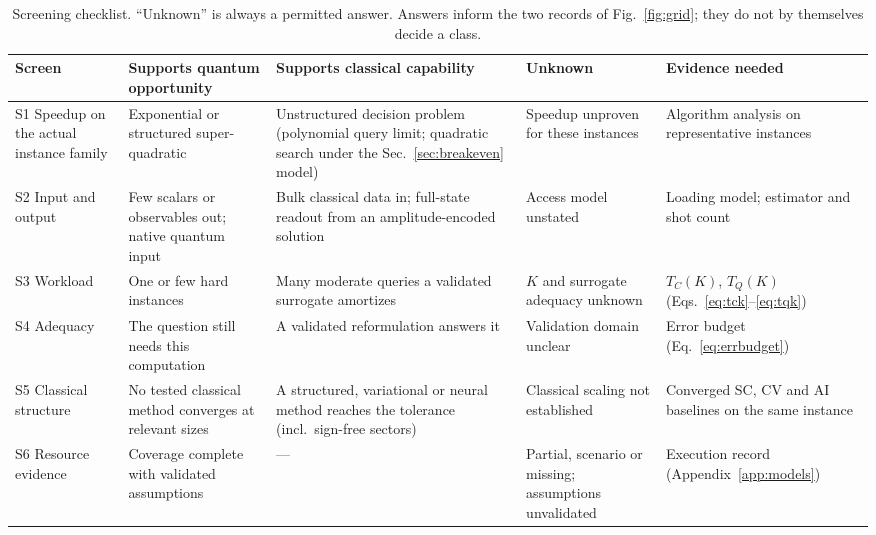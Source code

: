 \documentclass[10pt,a4paper]{article}
\newcommand{\mtC}{\textcolor{qcF}{\textsf{complete}}}
\begin{document}
\begin{table}[htbp]
\centering\scriptsize
\setlength{\tabcolsep}{4pt}
\caption{Screening checklist. ``Unknown'' is always a permitted answer. Answers inform the two records of Fig.~\ref{fig:grid}; they do not by themselves decide a class.}\label{tab:checklist}
\begin{tabular}{@{}L{3.1cm} >{}L{3.0cm} >{}L{3.0cm} >{}L{2.5cm} L{3.2cm}@{}}
\toprule
Screen & Supports quantum opportunity & Supports classical capability & Unknown & Evidence needed\\\midrule
S1 Speedup on the actual instance family & Exponential or structured super-quadratic & Unstructured decision problem (polynomial query limit; quadratic search under the Sec.~\ref{sec:breakeven} model) & Speedup unproven for these instances & Algorithm analysis on representative instances\\
S2 Input and output & Few scalars or observables out; native quantum input & Bulk classical data in; full-state readout from an amplitude-encoded solution & Access model unstated & Loading model; estimator and shot count\\
S3 Workload & One or few hard instances & Many moderate queries a validated surrogate amortizes & $K$ and surrogate adequacy unknown & $T_C(K)$, $T_Q(K)$ (Eqs.~\ref{eq:tck}--\ref{eq:tqk})\\
S4 Adequacy & The question still needs this computation & A validated reformulation answers it & Validation domain unclear & Error budget (Eq.~\ref{eq:errbudget})\\
S5 Classical structure & No tested classical method converges at relevant sizes & A structured, variational or neural method reaches the tolerance (incl.\ sign-free sectors) & Classical scaling not established & Converged SC, CV and AI baselines on the same instance\\
S6 Resource evidence & Coverage \mtC{} with validated assumptions & --- & Partial, scenario or missing; assumptions unvalidated & Execution record (Appendix~\ref{app:models})\\
\bottomrule
\end{tabular}
\end{table}
\end{document}
